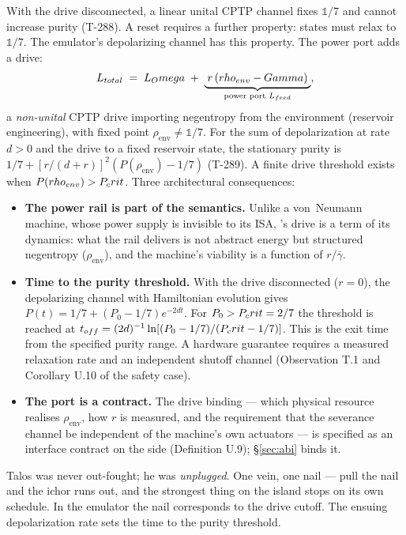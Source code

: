 With the drive disconnected, a linear unital CPTP channel fixes
$\mathbb{1}/7$ and cannot increase purity (T-288). A reset requires a
further property: states must relax to $\mathbb{1}/7$. The emulator's
depolarizing channel has this property. The power port adds a drive:
\begin{equation}
\label{eq:powerport}
L_{total} \;=\; L_Omega \;+\;
\underbrace{\;r\,(rho_{env}-Gamma)\;}_{\text{power port } L_{feed}},
\end{equation}
a \emph{non-unital} CPTP drive importing negentropy from the environment
(reservoir engineering), with fixed point $\rho_{\mathrm{env}}\neq\mathbb{1}/7$.
For the sum of depolarization at rate $d>0$ and the drive to a fixed reservoir state,
the stationary purity is $1/7+[r/(d+r)]^2(P(\rho_{\mathrm{env}})-1/7)$
(T-289). A finite drive threshold exists when $P(rho_{env})>P_crit$.
Three architectural
consequences:
\begin{itemize}[leftmargin=1.5em,itemsep=1pt]
  \item \textbf{The power rail is part of the semantics.} Unlike a von~Neumann
        machine, whose power supply is invisible to its ISA, \TALOS{}'s drive
        is a term of its dynamics: what the rail delivers is not abstract
        energy but structured negentropy ($\rho_{\mathrm{env}}$), and the
        machine's viability is a function of $r/\bar\gamma$.
  \item \textbf{Time to the purity threshold.} With the drive disconnected
        ($r=0$), the depolarizing channel with Hamiltonian evolution gives
        $P(t)=1/7+(P_0-1/7)e^{-2dt}$. For $P_0>P_crit=2/7$ the threshold
        is reached at
        $t_{off}=(2d)^{-1}\ln[(P_0-1/7)/(P_crit-1/7)]$.
        This is the exit time from the specified purity range. A hardware
        guarantee requires a measured relaxation rate and an independent
        shutoff channel (Observation T.1 and Corollary U.10 of the \SYNARC{} safety case).
  \item \textbf{The port is a contract.} The drive binding --- which physical
        resource realises $\rho_{\mathrm{env}}$, how $r$ is measured, and the
        requirement that the severance channel be independent of the
        machine's own actuators --- is specified as an interface contract on
        the \SYNARC{} side (Definition U.9); \S\ref{sec:abi} binds it.
\end{itemize}
\begin{mythbox}
Talos was never out-fought; he was \emph{unplugged}. One vein, one nail ---
pull the nail and the ichor runs out, and the strongest thing on the island
stops on its own schedule. In the emulator the nail corresponds to the drive cutoff. The ensuing
depolarization rate sets the time to the purity threshold.
\end{mythbox}

